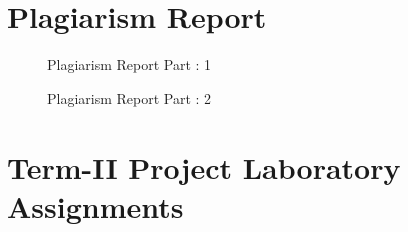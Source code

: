 \documentclass[oneside,a4paper,12pt]{book}
\begin{document}
\begin{appendices}
\chapter{Plagiarism Report}

\begin{center}
    \begin{figure}[!htbp]
        \centering
        \caption{Plagiarism Report Part : 1}
    \end{figure}
\end{center}


\begin{center}
    \begin{figure}[!htbp]
        \centering
        \caption{Plagiarism Report Part : 2}
    \end{figure}
\end{center}


\chapter{Term-II Project Laboratory Assignments}



\end{appendices}
\end{document}
